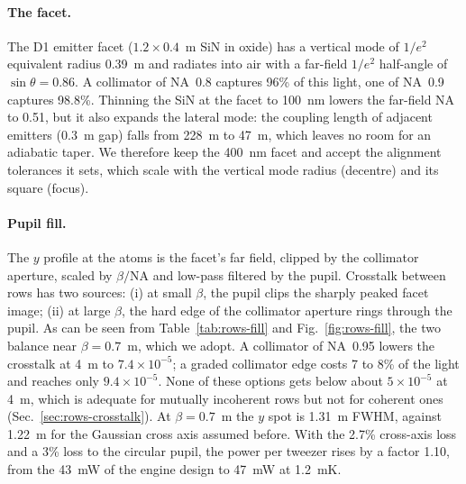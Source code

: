 \paragraph{The facet.} The D1 emitter facet ($1.2\times0.4$~\textmu m SiN in oxide) has a vertical mode of
$1/e^2$ equivalent radius 0.39~\textmu m and radiates into air with a far-field $1/e^2$ half-angle of
$\sin\theta=0.86$. A collimator of NA~0.8 captures 96\% of this light, one of NA~0.9 captures 98.8\%.
Thinning the SiN at the facet to 100~nm lowers the far-field NA to 0.51, but it also expands the lateral mode:
the coupling length of adjacent emitters (0.3~\textmu m gap) falls from 228~\textmu m to 47~\textmu m, which
leaves no room for an adiabatic taper. We therefore keep the 400~nm facet and accept the alignment tolerances
it sets, which scale with the vertical mode radius (decentre) and its square (focus).

\paragraph{Pupil fill.} The $y$ profile at the atoms is the facet's far field, clipped by the collimator
aperture, scaled by $\beta/\mathrm{NA}$ and low-pass filtered by the pupil. Crosstalk between rows has two
sources: (i) at small $\beta$, the pupil clips the sharply peaked facet image; (ii) at large $\beta$, the hard
edge of the collimator aperture rings through the pupil. As can be seen from Table~\ref{tab:rows-fill} and
Fig.~\ref{fig:rows-fill}, the two balance near $\beta=0.7$~\textmu m, which we adopt. A collimator of NA~0.95
lowers the crosstalk at 4~\textmu m to $7.4\times10^{-5}$; a graded collimator edge costs 7 to 8\% of the light
and reaches only $9.4\times10^{-5}$. None of these options gets below about $5\times10^{-5}$ at 4~\textmu m,
which is adequate for mutually incoherent rows but not for coherent ones (Sec.~\ref{sec:rows-crosstalk}). At
$\beta=0.7$~\textmu m the $y$ spot is 1.31~\textmu m FWHM, against 1.22~\textmu m for the Gaussian cross axis
assumed before. With the 2.7\% cross-axis loss and a 3\% loss to the circular pupil, the power per tweezer
rises by a factor 1.10, from the 43~mW of the engine design to 47~mW at 1.2~mK.

